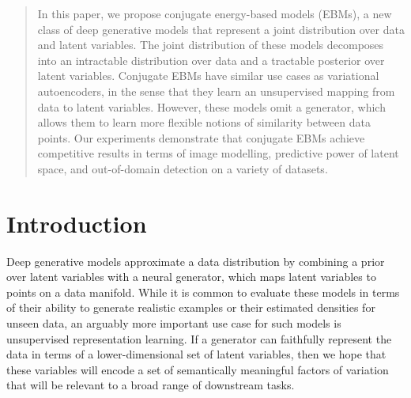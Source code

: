 \documentclass{article}
\begin{document}
\begin{abstract}
In this paper, we propose conjugate energy-based models (EBMs), a new class of deep generative models that represent a joint distribution over data and latent variables. The joint distribution of these models decomposes into an intractable distribution over data and a tractable posterior over latent variables. Conjugate EBMs have similar use cases as variational autoencoders, in the sense that they learn an unsupervised mapping from data to latent variables. However, these models omit a generator, which allows them to learn more flexible notions of similarity between data points. Our experiments demonstrate that conjugate EBMs achieve competitive results in terms of image modelling, predictive power of latent space, and out-of-domain detection on a variety of datasets. 
\end{abstract}


\section{Introduction}
\label{sec:intro}




Deep generative models approximate a data distribution by combining a prior over latent variables with a neural generator, which maps latent variables to points on a data manifold. While it is common to evaluate these models in terms of their ability to generate realistic examples or their estimated densities for unseen data, an arguably more important use case for such models is unsupervised representation learning. If a generator can faithfully represent the data in terms of a lower-dimensional set of latent variables, then we hope that these variables will encode a set of semantically meaningful factors of variation that will be relevant to a broad range of downstream tasks.
\end{document}
